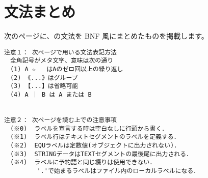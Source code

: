% 
%
\chapter{{\as}文法まとめ}
\label{app:as}

次のページに、{\as}の文法を BNF 風にまとめたものを掲載します。

\begin{verbatim}
注意１： 次ページで用いる文法表記方法
　全角記号がメタ文字、意味は次の通り
　(1) A ☆   はAのゼロ回以上の繰り返し
　(2) 《...》はグループ
　(3) 【...】は省略可能
　(4) A ｜ B は A または B


注意２： 次ページを読む上での注意事項
　(※0)  ラベルを宣言する時は空白なしに行頭から書く．
　(※1)  ラベル行はテキストセグメントのラベルを定義する．
　(※2)  EQUラベルは定数値(オブジェクトに出力されない)．
　(※3)  STRINGデータはTEXTセグメントの最後尾に出力される．
　(※4)  ラベルに予約語と同じ綴りは使用できない．
         '.'で始まるラベルはファイル内のローカルラベルになる．
\end{verbatim}

